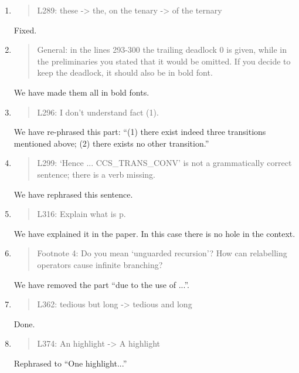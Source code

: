 \begin{enumerate}
\item \begin{quote}
    L289: these -> the, on the tenary -> of the ternary
  \end{quote}
  Fixed.
  
\item \begin{quote}
    General: in the lines 293-300 the trailing deadlock 0 is given,
    while in the preliminaries you stated that it would be omitted. If
    you decide to keep the deadlock, it should also be in bold font.
  \end{quote}
  We have made them all in bold fonts.
  
\item \begin{quote}
    L296: I don’t understand fact (1).
  \end{quote}
We have re-phrased this part: ``(1) there exist indeed three
  transitions mentioned above; (2) there exists no other
  transition.''
  
\item \begin{quote}
    L299: ‘Hence ... CCS_TRANS_CONV’ is not a grammatically correct sentence; there is a verb missing.
  \end{quote}
  We have rephrased this sentence.

\item \begin{quote}
    L316: Explain what is p.
  \end{quote}
  We have explained it in the paper. In this case there is no hole in the context.
  
\item \begin{quote}
    Footnote 4: Do you mean ‘unguarded recursion’? How can relabelling operators cause infinite branching?
  \end{quote}
  We have removed the part ``due to the use of ...''. 
  
\item \begin{quote}
    L362: tedious but long -> tedious and long
  \end{quote}
  Done.
  
\item \begin{quote}
    L374: An highlight -> A highlight
  \end{quote}
  Rephrased to ``One highlight...''
  

\end{enumerate}
